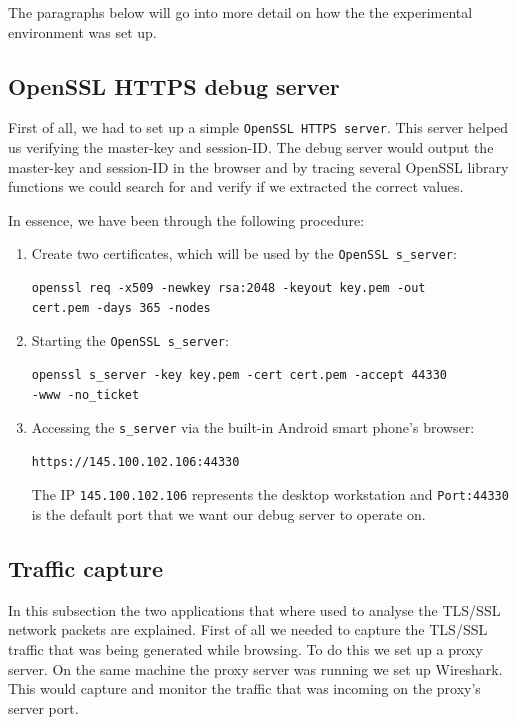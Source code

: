 \documentclass[12pt, a4paper]{report}
\begin{document}
The paragraphs below will go into more detail on how the the experimental environment was set up.


\subsection{OpenSSL HTTPS debug server}

First of all, we had to set up a simple \texttt{OpenSSL HTTPS server}. This server helped us verifying the master-key and session-ID. The debug server would output the master-key and session-ID in the browser and by tracing several OpenSSL library functions we could search for and verify if we extracted the correct values.

In essence, we have been through the following procedure:

\begin{enumerate}
\item Create two certificates, which will be used by the \texttt{OpenSSL s\_server}:
\begin{lstlisting}[frame=single, breaklines=true]
openssl req -x509 -newkey rsa:2048 -keyout key.pem -out
cert.pem -days 365 -nodes	
\end{lstlisting}	

\item Starting the \texttt{OpenSSL s\_server}:
\begin{lstlisting}[frame=single, breaklines=true]
openssl s_server -key key.pem -cert cert.pem -accept 44330
-www -no_ticket
\end{lstlisting}

\item Accessing the \texttt{s\_server} via the built-in Android smart phone's browser:
\begin{lstlisting}[frame=single, breaklines=true]
https://145.100.102.106:44330
\end{lstlisting}
The IP \texttt{145.100.102.106} represents the desktop workstation and \texttt{Port:44330} is the default port that we want our debug server to operate on.  

\end{enumerate}

\subsection{Traffic capture}

In this subsection the two applications that where used to analyse the TLS/SSL network packets are explained. First of all we needed to capture the TLS/SSL traffic that was being generated while browsing. To do this we set up a proxy server. On the same machine the proxy server was running we set up Wireshark. This would capture and monitor the traffic that was incoming on the proxy's server port.
\end{document}
